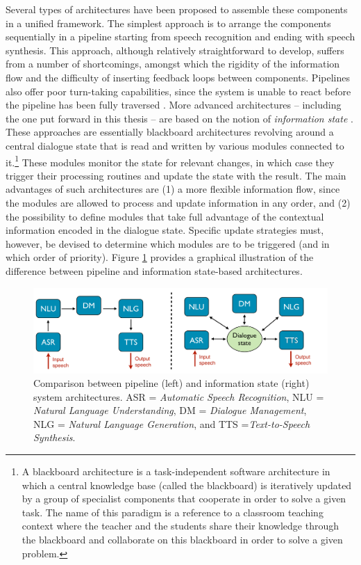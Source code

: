 Several types of architectures have been proposed to assemble these components in a unified framework.  The simplest approach is to arrange the components sequentially in a pipeline starting from speech recognition and ending with speech synthesis.  This approach, although relatively straightforward to develop, suffers from a number of shortcomings, amongst which the rigidity of the information flow and the difficulty of inserting feedback loops between components. Pipelines also offer poor turn-taking capabilities, since the system is unable to react before the pipeline has been fully traversed \citep{RauxE09}. More advanced architectures -- including the one put forward in this thesis -- are based on the notion of \textit{information state} \citep{Larsson:2000,Bos2003}.  These approaches are essentially blackboard architectures revolving around a central dialogue state that is read and written by various modules connected to it.\footnote{A blackboard architecture is a task-independent software architecture in which a central knowledge base (called the blackboard) is iteratively updated by a group of specialist components that cooperate in order to solve a given task. The name of this paradigm is a reference to a classroom teaching context where the teacher and the students share their knowledge through the blackboard and collaborate on this blackboard in order to solve a given problem.} These modules monitor the state for relevant changes, in which case they trigger their processing routines and update the state with the result.  The main advantages of such architectures are (1) a more flexible information flow, since the modules are allowed to process and update information in any order, and (2) the possibility to define modules that take full advantage of the contextual information encoded in the dialogue state. Specific update strategies must, however, be devised to determine which modules are to be triggered (and in which order of priority). Figure \ref{fig:architecture_comp} provides a graphical illustration of the difference between pipeline and information state-based architectures.  

 \begin{figure}[h!]
\centering
\includegraphics[scale=0.28]{imgs/architecture_comparison.pdf}
\caption{Comparison between pipeline (left) and information state (right) system architectures.   ASR = \textit{Automatic Speech Recognition}, NLU = \textit{Natural Language Understanding}, DM = \textit{Dialogue Management}, NLG = \textit{Natural Language Generation}, and TTS =\textit{Text-to-Speech Synthesis}.}
\label{fig:architecture_comp}
\end{figure}

